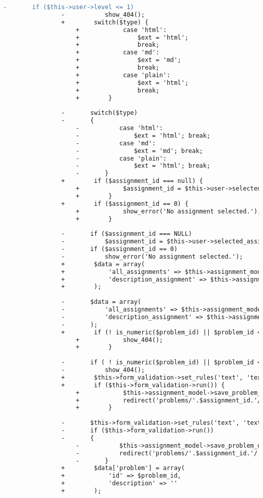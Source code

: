 \begin{lstlisting}[language=diff, caption=Perubahan pada kode Problems.php]
				-		if ($this->user->level <= 1)
				-			show_404();
				+        switch($type) {
					+            case 'html':
					+                $ext = 'html';
					+                break;
					+            case 'md':
					+                $ext = 'md';
					+                break;
					+            case 'plain':
					+                $ext = 'html';
					+                break;
					+        }
				
				-		switch($type)
				-		{
					-			case 'html':
					-				$ext = 'html'; break;
					-			case 'md':
					-				$ext = 'md'; break;
					-			case 'plain':
					-				$ext = 'html'; break;
					-		}
				+        if ($assignment_id === null) {
					+            $assignment_id = $this->user->selected_assignment['id'];
					+        }
				+        if ($assignment_id == 0) {
					+            show_error('No assignment selected.');
					+        }
				
				-		if ($assignment_id === NULL)
				-			$assignment_id = $this->user->selected_assignment['id'];
				-		if ($assignment_id == 0)
				-			show_error('No assignment selected.');
				+        $data = array(
				+            'all_assignments' => $this->assignment_model->all_assignments(),
				+            'description_assignment' => $this->assignment_model->assignment_info($assignment_id),
				+        );
				
				-		$data = array(
				-			'all_assignments' => $this->assignment_model->all_assignments(),
				-			'description_assignment' => $this->assignment_model->assignment_info($assignment_id),
				-		);
				+        if (! is_numeric($problem_id) || $problem_id < 1 || $problem_id > $data['description_assignment']['problems']) {
					+            show_404();
					+        }
				
				-		if ( ! is_numeric($problem_id) || $problem_id < 1 || $problem_id > $data['description_assignment']['problems'])
				-			show_404();
				+        $this->form_validation->set_rules('text', 'text', ''); /* todo: xss clean */
				+        if ($this->form_validation->run()) {
					+            $this->assignment_model->save_problem_description($assignment_id, $problem_id, $this->input->post('text'), $ext);
					+            redirect('problems/'.$assignment_id.'/'.$problem_id);
					+        }
				
				-		$this->form_validation->set_rules('text', 'text' ,''); /* todo: xss clean */
				-		if ($this->form_validation->run())
				-		{
					-			$this->assignment_model->save_problem_description($assignment_id, $problem_id, $this->input->post('text'), $ext);
					-			redirect('problems/'.$assignment_id.'/'.$problem_id);
					-		}
				+        $data['problem'] = array(
				+            'id' => $problem_id,
				+            'description' => ''
				+        );
				

\end{lstlisting}
